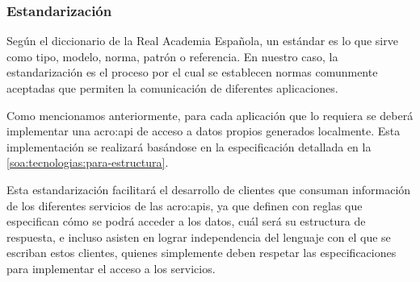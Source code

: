 
\subsubsection{Estandarización}

Según el diccionario de la Real Academia Española, un estándar es lo que sirve como tipo, modelo, norma, patrón o referencia. En nuestro caso, la estandarización es el proceso por el cual se establecen normas comunmente aceptadas que permiten la comunicación de diferentes aplicaciones.

Como mencionamos anteriormente, para cada aplicación que lo requiera se deberá implementar una \gls{acro:api} de acceso a datos propios generados localmente. Esta implementación se realizará basándose en la especificación  detallada en la \autoref{soa:tecnologias:para-estructura}.

Esta estandarización facilitará el desarrollo de clientes que consuman información de los diferentes servicios de las \glspl{acro:api}, ya que definen con reglas que especifican cómo se podrá acceder a los datos, cuál será su estructura de respuesta, e incluso asisten en lograr independencia del lenguaje con el que se escriban estos clientes, quienes simplemente deben respetar las especificaciones para implementar el acceso a los servicios.
